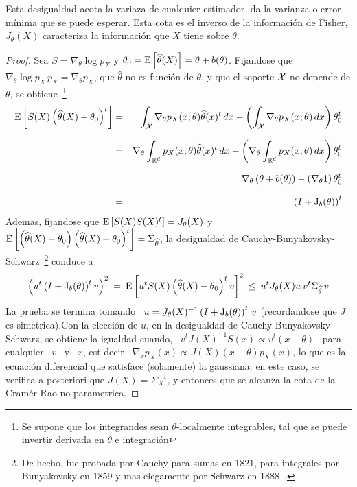 %
\noindent Esta  desigualdad acota la variaza  de cualquier estimador,  \ie da la
varianza o error  m\'inima que se puede  esperar. Esta cota es el  inverso de la
informaci\'on de Fisher, \ie  $J_\theta(X)$ caracteriza la informaci\'on que $X$
tiene sobre $\theta$.
%
\begin{proof}
  Sea $S = \nabla_\theta \log  p_X$ y $\theta_0 = \operatorname{E}\left[ \widehat{\theta}(X)
  \right] = \theta + b(\theta)$. Fijandose  que $\nabla_\theta \log p_X \, p_X =
  \nabla_\theta p_X$, que $\widehat{\theta}$ no  es funci\'on de $\theta$, y que
  el soporte $\mathcal{X}$ no depende de $\theta$, se obtiene~\footnote{Se supone que los
    integrandes sean $\theta$-localmente integrables,  tal que se puede invertir
    derivada en $\theta$ e integraci\'on}
  \begin{eqnarray*}
  \operatorname{E}\left[ S(X) \left( \widehat{\theta}(X) - \theta_0 \right)^t \right] & = &
  \int_{\mathcal{X}} \nabla_\theta p_X(x;\theta) \widehat{\theta}(x)^t \, dx - \left(
  \int_{\mathcal{X}} \nabla_\theta p_X(x;\theta) \, dx \right) \theta_0^t\\[2.5mm]
  & = & \nabla_\theta \int_{\mathbb{R}^d} p_X(x;\theta) \widehat{\theta}(x)^t \, dx -
  \left( \nabla_\theta \int_{\mathbb{R}^d} p_X(x;\theta) \, dx \right)
  \theta_0^t\\[2.5mm]
  & = & \nabla_\theta \left( \theta + b(\theta) \right)  - 
  \left( \nabla_\theta 1 \right) \theta_0^t\\[2.5mm]
  & = & \left( I + \operatorname{J}_b(\theta) \right)^t
  \end{eqnarray*}
  Ademas,  fijandose  que  $\operatorname{E}\left[  S(X)  S(X)^t \right]  =  J_\theta(X)$  y
  $\operatorname{E}\left[   \left(    \widehat{\theta}(X)   -   \theta_0    \right)   \left(
      \widehat{\theta}(X)      -      \theta_0      \right)^t     \right]      =
  \Sigma_{\widehat{\theta}}$,            la            desigualdad            de
  Cauchy-Bunyakovsky-Schwarz~\footnote{De  hecho, fue  probada  por Cauchy  para
    sumas en 1821, para integrales por  Bunyakovsky en 1859 y mas elegamente por
    Schwarz  en  1888~\cite{Ste04}.}   conduce  a
  \[
  \left( u^t \left( I + \operatorname{J}_b(\theta)  \right)^t v \right)^2 \: = \: \operatorname{E}\left[
    u^t S(X) \left( \widehat{\theta}(X) -  \theta_0 \right)^t v \right]^2 \: \le
  \: u^t J_\theta(X) u \: v^t \Sigma_{\widehat{\theta}} \, v
  \]
  La prueba se termina tomando \ $u = J_\theta(X)^{-1} \left( I + \operatorname{J}_b(\theta)
  \right)^t \, v$ (recordandose que $J$ es simetrica).\newline Con la elecci\'on
  de  $u$,  en  la  desigualdad  de Cauchy-Bunyakovsky-Schwarz,  se  obtiene  la
  igualdad  cuando, \  $v^t J(X)^{-1}  S(x)  \propto v^t  (x -  \theta)$ \  para
  cualquier \  $v$ \ y \  $x$, est decir \  $\nabla_x p_X (x) \propto  J(X) (x -
  \theta) p_X(x)$, lo que es la ecuaci\'on diferencial que satisface (solamente)
  la  gaussiana:   en  este  caso,  se   verifica  a  posteriori   que  $J(X)  =
  \Sigma_X^{-1}$,  y entonces  que  se alcanza  la  cota de  la Cram\'er-Rao  no
  parametrica.
\end{proof}
